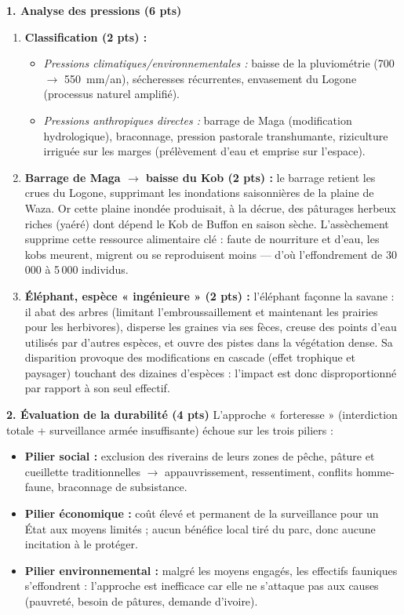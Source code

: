 \documentclass[11pt]{article}
\begin{document}
\begin{corrige}
\textbf{1. Analyse des pressions (6 pts)}
\begin{enumerate}
\item \textbf{Classification (2 pts) :}
\begin{itemize}
\item \emph{Pressions climatiques/environnementales :} baisse de la pluviométrie (700 $\to$ \SI{550}{mm/an}), sécheresses récurrentes, envasement du Logone (processus naturel amplifié).
\item \emph{Pressions anthropiques directes :} barrage de Maga (modification hydrologique), braconnage, pression pastorale transhumante, riziculture irriguée sur les marges (prélèvement d'eau et emprise sur l'espace).
\end{itemize}
\item \textbf{Barrage de Maga $\to$ baisse du Kob (2 pts) :} le barrage retient les crues du Logone, supprimant les inondations saisonnières de la plaine de Waza. Or cette plaine inondée produisait, à la décrue, des pâturages herbeux riches (yaéré) dont dépend le Kob de Buffon en saison sèche. L'assèchement supprime cette ressource alimentaire clé : faute de nourriture et d'eau, les kobs meurent, migrent ou se reproduisent moins — d'où l'effondrement de 30\,000 à 5\,000 individus.
\item \textbf{Éléphant, espèce « ingénieure » (2 pts) :} l'éléphant façonne la savane : il abat des arbres (limitant l'embroussaillement et maintenant les prairies pour les herbivores), disperse les graines via ses fèces, creuse des points d'eau utilisés par d'autres espèces, et ouvre des pistes dans la végétation dense. Sa disparition provoque des modifications en cascade (effet trophique et paysager) touchant des dizaines d'espèces : l'impact est donc disproportionné par rapport à son seul effectif.
\end{enumerate}

\textbf{2. Évaluation de la durabilité (4 pts)}
L'approche « forteresse » (interdiction totale + surveillance armée insuffisante) échoue sur les trois piliers :
\begin{itemize}
\item \textbf{Pilier social :} exclusion des riverains de leurs zones de pêche, pâture et cueillette traditionnelles $\to$ appauvrissement, ressentiment, conflits homme-faune, braconnage de subsistance.
\item \textbf{Pilier économique :} coût élevé et permanent de la surveillance pour un État aux moyens limités ; aucun bénéfice local tiré du parc, donc aucune incitation à le protéger.
\item \textbf{Pilier environnemental :} malgré les moyens engagés, les effectifs fauniques s'effondrent : l'approche est inefficace car elle ne s'attaque pas aux causes (pauvreté, besoin de pâtures, demande d'ivoire).
\end{itemize}


\end{corrige}
\end{document}
